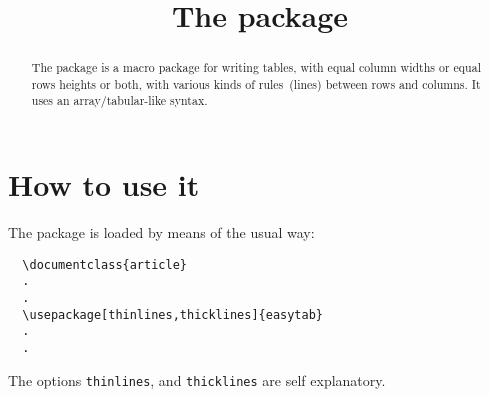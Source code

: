 \documentclass[a4paper,final,11pt]{article}
\title{The package \package{easytable}}
\begin{document}
\maketitle
\begin{abstract}
  The  package is a macro package for writing
  tables, with equal column widths or equal rows heights or both, with
  various kinds of rules~(lines) between rows and columns.  It uses an
  array/tabular-like syntax.
\end{abstract}

\pagestyle{fpage}
\def\sectionmark#1{\markboth{The package \package{easytable}}{The package \package{easytable}}}
\let\chaptermark\sectionmark
\let\subsectionmark\sectionmark

\section{How to use it}
The package is loaded by means of the usual way:
\begin{verbatim}
  \documentclass{article}
  .
  .
  \usepackage[thinlines,thicklines]{easytab}
  .
  .
\end{verbatim}
The options \texttt{thinlines}, and \texttt{thicklines} are self explanatory.
\end{document}
